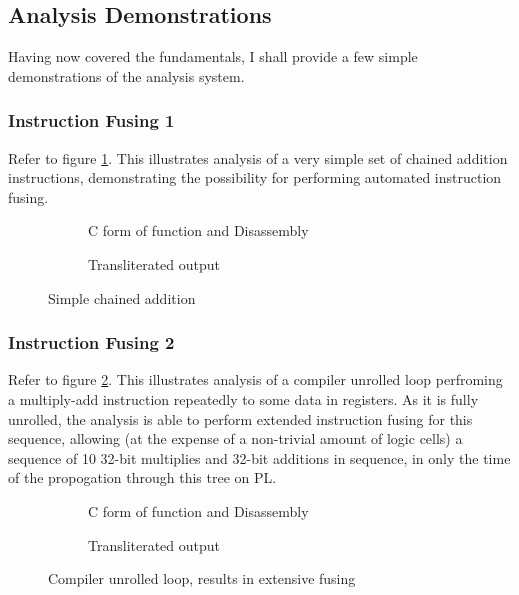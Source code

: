 \documentclass[a4paper]{article}
\begin{document}
\subsection{Analysis Demonstrations}

Having now covered the fundamentals, I shall provide a few simple demonstrations of the analysis system.

\subsubsection{Instruction Fusing 1}
Refer to figure \ref{fig:if1}.
This illustrates analysis of a very simple set of chained addition instructions, demonstrating the possibility for performing automated instruction fusing.

\begin{figure}
  \begin{subfigure}[b]{0.5\textwidth}
    
    
    \caption{C form of function and Disassembly}
  \end{subfigure}
  \begin{subfigure}[b]{0.5\textwidth}
    
    \caption{Transliterated output}
  \end{subfigure}
  \caption{Simple chained addition}
  \label{fig:if1}
\end{figure}

\subsubsection{Instruction Fusing 2}
Refer to figure \ref{fig:if2}.
This illustrates analysis of a compiler unrolled loop perfroming a multiply-add instruction repeatedly to some data in registers.
As it is fully unrolled, the analysis is able to perform extended instruction fusing for this sequence, allowing (at the expense of a non-trivial amount of logic cells) a sequence of 10 32-bit multiplies and 32-bit additions in sequence, in only the time of the propogation through this tree on PL.

\begin{figure}
  \begin{subfigure}[b]{0.5\textwidth}
    
    
    \caption{C form of function and Disassembly}
  \end{subfigure}
  \begin{subfigure}[b]{0.5\textwidth}
    
    \caption{Transliterated output}
  \end{subfigure}
  \caption{Compiler unrolled loop, results in extensive fusing}
  \label{fig:if2}
\end{figure}
\end{document}
